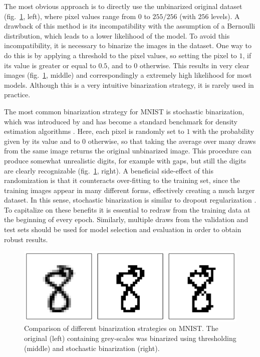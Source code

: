 The most obvious approach is to directly use the unbinarized original dataset (fig.~\ref{fig:MNISTBinarizationComparison}, left), where pixel values range from $0$ to $255/256$ (with $256$ levels). A drawback of this method is its incompatibility with the assumption of a Bernoulli distribution, which leads to a lower likelihood of the model.
To avoid this incompatibility, it is necessary to binarize the images in the dataset. One way to do this is by applying a threshold to the pixel values, so setting the pixel to $1$, if its value is greater or equal to $0.5$, and to $0$ otherwise. This results in very clear images (fig.~\ref{fig:MNISTBinarizationComparison}, middle) and correspondingly a extremely high likelihood for most models. Although this is a very intuitive binarization strategy, it is rarely used in practice.

The most common binarization strategy for MNIST is stochastic binarization, which was introduced by \textcite{Salakhutdinov2008} and has become a standard benchmark for density estimation algorithms \parencite{Salimans2014,Rezende2014,Gregor2015}. Here, each pixel is randomly set to $1$ with the probability given by its value and to $0$ otherwise, so that taking the average over many draws from the same image returns the original unbinarized image. This procedure can produce somewhat unrealistic digits, for example with gaps, but still the digits are clearly recognizable (fig.~\ref{fig:MNISTBinarizationComparison}, right). A beneficial side-effect of this randomization is that it counteracts over-fitting to the training set, since the training images appear in many different forms, effectively creating a much larger dataset. In this sense, stochastic binarization is similar to dropout regularization \parencite{Hinton2012}. To capitalize on these benefits it is essential to redraw from the training data at the beginning of every epoch. Similarly, multiple draws from the validation and test sets should be used for model selection and evaluation in order to obtain robust results. 

\begin{figure}
\centering
\includegraphics[width=\columnwidth]{figures/binarization_example.pdf}
\caption{Comparison of different binarization strategies on MNIST. The original (left) containing grey-scales was binarized using thresholding (middle) and stochastic binarization (right).}
\label{fig:MNISTBinarizationComparison}
\end{figure}


